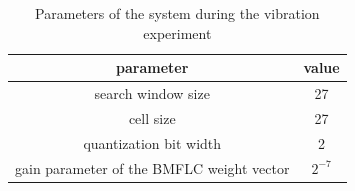 \begin{table}[tb]
  \centering
  \caption{Parameters of the system during the vibration experiment}
  \label{bit_table:vibration_parameter}
  \begin{tabular}{|c|c|}
    \hline
    parameter   & value                \\ \hline \hline
    search window size & 27 \\\hline
    cell size   & 27          \\\hline
    quantization bit width   & 2      \\\hline
    gain parameter of the BMFLC weight vector & $2^{-7}$ \\ \hline
  \end{tabular}
\end{table}





